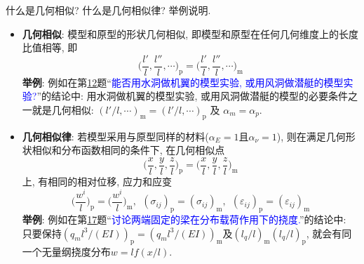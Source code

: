 \begin{problem}[27]
什么是几何相似? 什么是几何相似律? 举例说明.
\end{problem}
\begin{solution}
\begin{itemize}
\item \textbf{几何相似}: 模型和原型的形状几何相似, 即模型和原型在任何几何维度上的长度比值相等, 即
\[
\bigg(\frac{l'}{l}, \frac{l''}{l},\cdots\bigg)_\mathrm{p} = \bigg(\frac{l'}{l}, \frac{l''}{l},\cdots\bigg)_\mathrm{m}
\]
\textbf{举例}: 例如在第\hyperref[problem:12]{12}题``\textcolor{blue}{能否用水洞做机翼的模型实验, 或用风洞做潜艇的模型实验?}''的结论中: 用水洞做机翼的模型实验, 或用风洞做潜艇的模型的必要条件之一就是几何相似:
$(l'/l,\cdots)_\mathrm{m}=(l'/l,\cdots)_\mathrm{p}$ 及 $\alpha_m = \alpha_p$.
\item \textbf{几何相似律}: 若模型采用与原型同样的材料($\alpha_E=1$且$\alpha_\nu=1$), 则在满足几何形状相似和分布函数相同的条件下, 在几何相似点
\[
\bigg(\frac{x}{l},\frac{y}{l},\frac{z}{l}\bigg)_\mathrm{p} 
=
\bigg(\frac{x}{l},\frac{y}{l},\frac{z}{l}\bigg)_\mathrm{m} 
\]
上, 有相同的相对位移, 应力和应变
\[
\bigg(\frac{w^i}{l}\bigg)_\mathrm{p} = \bigg(\frac{w^i}{l}\bigg)_\mathrm{m},~~
(\sigma_{ij})_\mathrm{p} = (\sigma_{ij})_\mathrm{m},~~
(\varepsilon_{ij})_\mathrm{p} = (\varepsilon_{ij})_\mathrm{m}
\]
\textbf{举例}: 例如在第\hyperref[problem:17]{17}题``\textcolor{blue}{讨论两端固定的梁在分布载荷作用下的挠度.}''的结论中: 只要保持$(q_m l^3/(EI))_\mathrm{p}=(q_m l^3/(EI))_\mathrm{m}$及$(l_q/l)_\mathrm{m}(l_q/l)_\mathrm{p}$, 就会有同一个无量纲挠度分布$w=lf(x/l)$.
\end{itemize}
\end{solution}
